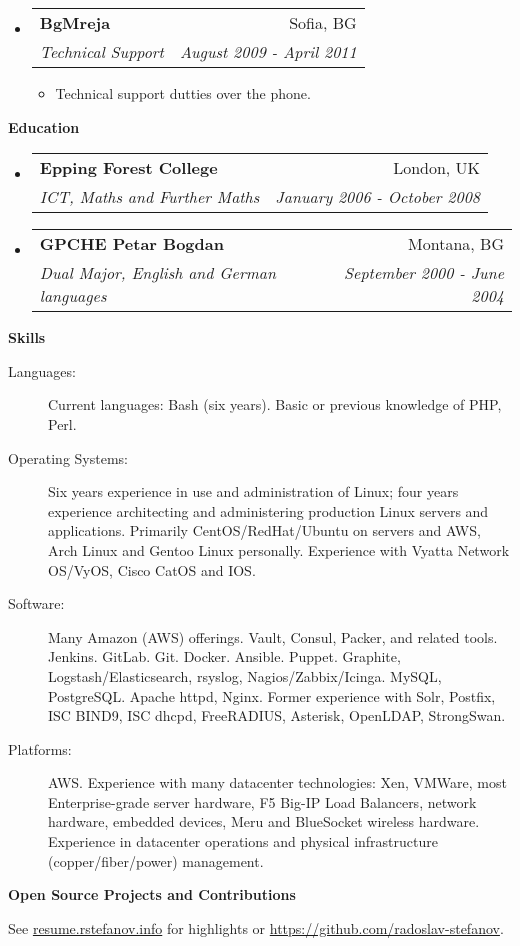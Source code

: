 \documentclass[letterpaper,11pt]{article}
\makeatletter
\newcommand{\resitem}[1]{\item #1 \vspace{-2pt}}
\newcommand{\resheading}[1]{{\large \colorbox{mygrey}{\begin{minipage}{\textwidth}{\textbf{#1 \vphantom{p\^{E}}}}\end{minipage}}}}
\newcommand{\ressubheading}[4]{
\begin{tabular*}{7.0in}{l@{\extracolsep{\fill}}r}
		\textbf{#1} & #2 \\
		\textit{#3} & \textit{#4} \\
\end{tabular*}\vspace{-6pt}}
\makeatother
\begin{document}
\begin{itemize}
\item
	\ressubheading{BgMreja}{Sofia, BG}{Technical Support}{August 2009 - April 2011}
	\begin{itemize}
                \resitem{Technical support dutties over the phone.}
	\end{itemize}
\end{itemize}

\resheading{Education}
\begin{itemize}
\item
	\ressubheading{Epping Forest College}{London, UK}{ICT, Maths and Further Maths}{January 2006 - October 2008}

\item
  \ressubheading{GPCHE Petar Bogdan}{Montana, BG}{Dual Major, English and German languages}{September 2000 - June 2004}
\end{itemize}

\resheading{Skills}

\begin{description}
\item[Languages:]
Current languages: Bash (six years). Basic or previous knowledge of PHP, Perl.
\item[Operating Systems:]
Six years experience in use and administration of Linux; four years experience architecting and administering production Linux servers and applications.
Primarily CentOS/RedHat/Ubuntu on servers and AWS, Arch Linux and Gentoo Linux personally. Experience with Vyatta Network OS/VyOS, Cisco CatOS and IOS.
\item[Software:]
Many Amazon (AWS) offerings. Vault, Consul, Packer, and related tools. Jenkins. GitLab. Git. Docker. Ansible. Puppet. Graphite, Logstash/Elasticsearch, rsyslog, Nagios/Zabbix/Icinga. MySQL, PostgreSQL. Apache httpd, Nginx.
Former experience with Solr, Postfix, ISC BIND9, ISC dhcpd, FreeRADIUS, Asterisk, OpenLDAP, StrongSwan.

\item[Platforms:]
AWS. Experience with many datacenter technologies: Xen, VMWare, most Enterprise-grade server hardware, F5 Big-IP Load Balancers, network hardware, embedded devices, Meru and BlueSocket wireless hardware. Experience in datacenter operations and physical infrastructure (copper/fiber/power) management.
\end{description}

\resheading{Open Source Projects and Contributions}
\begin{description}
\item{See \href{http://resume.rstefanov.info}{resume.rstefanov.info} for highlights or \href{https://github.com/radoslav-stefanov}{https://github.com/radoslav-stefanov}.}
\end{description}
\end{document}
